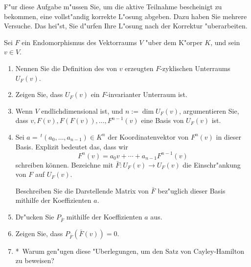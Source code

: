 \documentclass[a4,11pt]{article}
\begin{document}
\vspace*{-17mm}
{
\kopf
}




\begin{aufgabe}[Scheiblaboraufgabe]
F"ur diese Aufgabe m"ussen Sie, um die aktive Teilnahme bescheinigt zu
bekommen, eine vollst"andig korrekte L"osung abgeben.
Dazu haben Sie mehrere Versuche. Das hei"st, Sie d"urfen Ihre L"osung
nach der Korrektur "uberarbeiten.

  
Sei $F$ ein Endomorphismus des Vektorraums $V$ "uber dem K"orper $K$,
und sein $v \in V$.

\newcommand{\bonusitem}{\item\hspace*{-2.4mm}*\ }

  \begin{enumerate}
  \item Nennen Sie die Definition des von $v$ erzeugten
    $F$-zyklischen Unterraums $U_F(v)$.
  \item Zeigen Sie, dass $U_F(v)$ ein
    $F$-invarianter Unterraum ist.
  \item Wenn $V$ endlichdimensional ist, und $n := \dim U_F(v)$,
    argumentieren Sie, dass
    $v, F(v), F(F(v)), \ldots, F^{n-1}(v)$ eine
    Basis von $U_F(v)$ ist.
  \item Sei $a = \, ^t(a_0, \dots , a_{n-1}) \in K^n$ der
    Koordinatenvektor von $F^n(v)$ in dieser Basis. Explizit bedeutet das, dass wir
  \[
  F^n(v) = a_0 v + \cdots + a_{n-1} F^{n-1}(v) 
  \]
  schreiben können. 
  Bezeichne mit $\bar F \colon U_F(v) \to U_F(v)$ die 
  Einschr"ankung von $F$ auf $U_F(v)$.
    
  Beschreiben Sie die Darstellende Matrix von $\bar F$ bez"uglich
  dieser Basis mithilfe der Koeffizienten $a$.
  \item Dr"ucken Sie $P_{\bar F}$ mithilfe der Koeffizienten $a$ aus.
  \item Zeigen Sie, dass $P_{\bar F}(\bar F(v)) = 0$.
  \bonusitem Warum gen"ugen diese "Uberlegungen, um den Satz von
    Cayley-Hamilton zu beweisen?
\end{enumerate}
\end{aufgabe}
\end{document}
